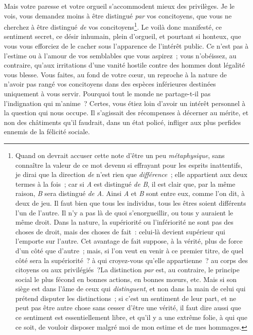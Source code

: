 \documentclass[french,twoside]{book} %
\begin{document}
Mais votre paresse et votre orgueil s’accommodent mieux des privilèges. Je le vois, vous demandez moins à être distingué {\itshape par} vos concitoyens, que vous ne cherchez à être distingué {\itshape de} vos concitoyens\footnote{ \noindent Quand on devrait accuser cette note d’être un peu {\itshape métaphysique}, sans connaître la valeur de ce mot devenu si effrayant pour les esprits inattentifs, je dirai que la direction {\itshape de} n’est rien que {\itshape différence} ; elle appartient aux deux termes à la fois ; car si {\itshape A} est distingué {\itshape de B}, il est clair que, par la même raison, {\itshape B} sera distingué {\itshape de A}. Ainsi {\itshape A} et {\itshape B} sont entre eux, comme l’on dit, à deux de jeu. Il faut bien que tous les individus, tous les êtres soient différents l’un de l’autre. Il n’y a pas là de quoi s’enorgueillir, ou tous y auraient le même droit. Dans la nature, la supériorité ou l’infériorité ne sont pas des choses de droit, mais des choses de fait : celui-là devient supérieur qui l’emporte sur l’autre. Cet avantage de fait suppose, à la vérité, plus de force d’un côté que d’autre ; mais, si l’on veut en venir à ce premier titre, de quel côté sera la supériorité ? à qui croyez-vous qu’elle appartienne ? au corps des citoyens ou aux privilégiés ?La distinction {\itshape par} est, au contraire, le principe social le plus fécond en bonnes actions, en bonnes mœurs, etc. Mais si son siège est dans l’âme de ceux qui {\itshape distinguent}, et non dans la main de celui qui prétend disputer les distinctions ; si c’est un sentiment de leur part, et ne peut pas être autre chose sans cesser d’être une vérité, il faut dire aussi que ce sentiment est essentiellement libre, et qu’il y a une extrême folie, à qui que ce soit, de vouloir disposer malgré moi de mon estime et de mes hommages.\par
 
 }. Le voilà donc manifesté, ce sentiment secret, ce désir inhumain, plein d’orgueil, et pourtant si honteux, que vous vous efforciez de le cacher sous l’apparence de l’intérêt public. Ce n’est pas à l’estime ou à l’amour de vos semblables que vous aspirez ; vous n’obéissez, au contraire, qu’aux irritations d’une vanité hostile contre des hommes dont légalité vous blesse. Vous faites, au fond de votre cœur, un reproche à la nature de n’avoir pas rangé vos concitoyens dans des espèces inférieures destinées uniquement à vous servir. Pourquoi tout le monde ne partage-t-il pas l’indignation qui m’anime ? Certes, vous étiez loin d’avoir un intérêt personnel à la question qui nous occupe. Il s’agissait des récompenses à décerner au mérite, et non des châtiments qu’il faudrait, dans un état policé, infliger aux plus perfides ennemis de la félicité sociale.\par
\end{document}
